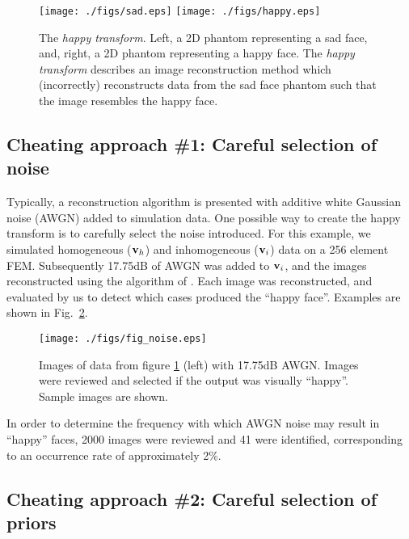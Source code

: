 \documentclass[12pt]{iopart}
\begin{document}
%
%
\begin{figure}[th]
\begin{flushright}
\texttt{[image: ./figs/sad.eps]}
\texttt{[image: ./figs/happy.eps]}
\caption{\small The 
{\em happy transform}. Left, a 2D phantom representing
a sad face, and, right, a 2D phantom representing a
happy face. The {\em happy transform} describes an
image reconstruction method which (incorrectly) 
reconstructs data from the sad face phantom such that the
image resembles the happy face.
 }
 \label{fig:happytransform}
\end{flushright}
\end{figure}

\subsection{ Cheating approach \#1:
 Careful selection of noise }

Typically, a reconstruction algorithm is presented
with additive white Gaussian noise (AWGN) added to simulation data. One
possible way to create the happy transform is to
carefully select the noise introduced.
For this example, we simulated homogeneous (${\bf v}_h$)
and inhomogeneous (${\bf v}_i$) data on a 256
element FEM. Subsequently 17.75dB of AWGN was added to
${\bf v}_i$, and the images reconstructed using
the algorithm of \cite{Adler_and_Guardo_1996}.
Each image was reconstructed, and evaluated by us to
detect which cases produced the ``happy face''.
Examples are shown in Fig.~\ref{fig:happynoise}.

%
%
\begin{figure}[th]
\begin{flushright}
\texttt{[image: ./figs/fig\_noise.eps]}
\caption{\small 
Images of data from figure \ref{fig:happytransform} (left)
with 17.75dB AWGN. Images were reviewed and selected if
the output was visually ``happy''. Sample images are shown.
 }
 \label{fig:happynoise}
\end{flushright}
\end{figure}

In order to determine the frequency with which AWGN noise
may result in ``happy'' faces, 2000
images were reviewed and 41 were identified, corresponding
to an occurrence rate of approximately 2\%.

\subsection{ Cheating approach \#2:
             Careful selection of priors}
\end{document}
